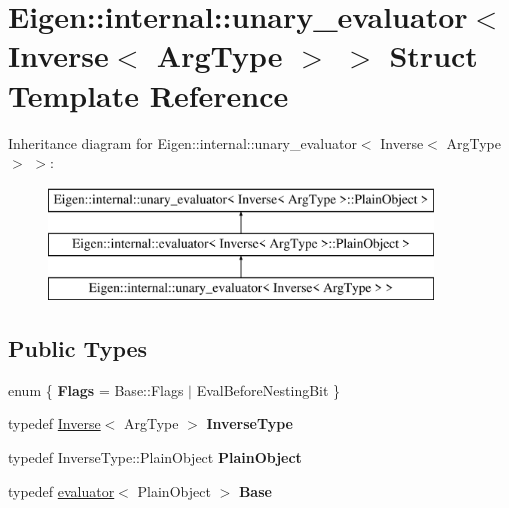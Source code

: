 \hypertarget{struct_eigen_1_1internal_1_1unary__evaluator_3_01_inverse_3_01_arg_type_01_4_01_4}{}\section{Eigen\+::internal\+::unary\+\_\+evaluator$<$ Inverse$<$ Arg\+Type $>$ $>$ Struct Template Reference}
\label{struct_eigen_1_1internal_1_1unary__evaluator_3_01_inverse_3_01_arg_type_01_4_01_4}
Inheritance diagram for Eigen\+::internal\+::unary\+\_\+evaluator$<$ Inverse$<$ Arg\+Type $>$ $>$\+:\begin{figure}[H]
\begin{center}
\leavevmode
\includegraphics[height=3.000000cm]{struct_eigen_1_1internal_1_1unary__evaluator_3_01_inverse_3_01_arg_type_01_4_01_4}
\end{center}
\end{figure}
\subsection*{Public Types}
\begin{DoxyCompactItemize}
\item 
\mbox{\label{struct_eigen_1_1internal_1_1unary__evaluator_3_01_inverse_3_01_arg_type_01_4_01_4_a0c7d67303aa00aea9a9e8877176964e8}} 
enum \{ {\bfseries Flags} = Base\+::Flags $\vert$ Eval\+Before\+Nesting\+Bit
 \}
\item 
\mbox{\label{struct_eigen_1_1internal_1_1unary__evaluator_3_01_inverse_3_01_arg_type_01_4_01_4_acb8daab382616bd66f0777eb235c7722}} 
typedef \mbox{\hyperlink{class_eigen_1_1_inverse}{Inverse}}$<$ Arg\+Type $>$ {\bfseries Inverse\+Type}
\item 
\mbox{\label{struct_eigen_1_1internal_1_1unary__evaluator_3_01_inverse_3_01_arg_type_01_4_01_4_a7dbf61383c4db34f3b1407b92fe8df78}} 
typedef Inverse\+Type\+::\+Plain\+Object {\bfseries Plain\+Object}
\item 
\mbox{\label{struct_eigen_1_1internal_1_1unary__evaluator_3_01_inverse_3_01_arg_type_01_4_01_4_ac3103f7fb8539beaa670abefd336cac3}} 
typedef \mbox{\hyperlink{struct_eigen_1_1internal_1_1evaluator}{evaluator}}$<$ Plain\+Object $>$ {\bfseries Base}
\end{DoxyCompactItemize}

